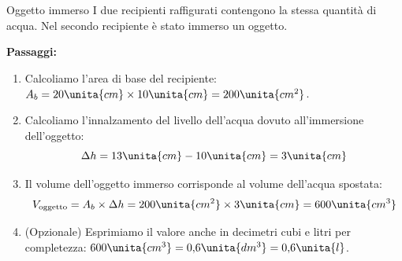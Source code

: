 \condnewpage
\begin{esercizio}{Oggetto immerso}
I due recipienti raffigurati contengono la stessa quantità di acqua. Nel secondo recipiente è stato immerso un oggetto.



\responsespace{8cm}

\begin{soluzione}
  \textbf{Passaggi:}
  \begin{enumerate}
    \item Calcoliamo l'area di base del recipiente: $A_b = 20\unita{cm} \times 10\unita{cm} = 200\unita{cm^2}$.
    \item Calcoliamo l'innalzamento del livello dell'acqua dovuto all'immersione dell'oggetto:
    \[
    \Delta h = 13\unita{cm} - 10\unita{cm} = 3\unita{cm}
    \]
    \item Il volume dell'oggetto immerso corrisponde al volume dell'acqua spostata:
    \[
    V_{\text{oggetto}} = A_b \times \Delta h = 200\unita{cm^2} \times 3\unita{cm} = 600\unita{cm^3}
    \]
    \item (Opzionale) Esprimiamo il valore anche in decimetri cubi e litri per completezza: $600\unita{cm^3} = 0{,}6\unita{dm^3} = 0{,}6\unita{l}$.
  \end{enumerate}
\end{soluzione}
\end{esercizio}



